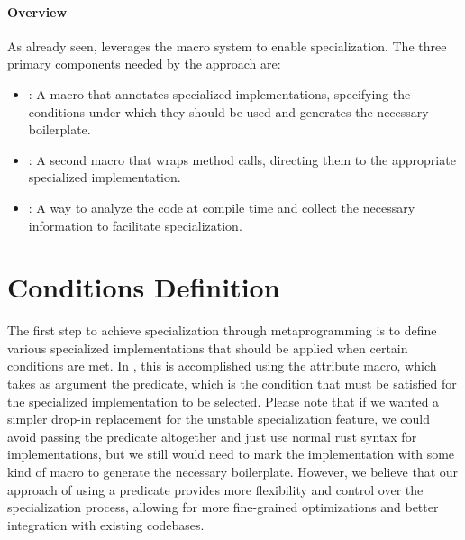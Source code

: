 \paragraph{Overview}
As already seen, \mytool{} leverages the macro system to enable specialization.
The three primary components needed by the approach are:
\begin{itemize}
	\item \textbf{}: A macro that annotates specialized implementations, specifying the conditions under which they should be used and generates the necessary boilerplate.
	\item \textbf{}: A second macro that wraps method calls, directing them to the appropriate specialized implementation.
	\item \textbf{}: A way to analyze the code at compile time and collect the necessary information to facilitate specialization.
\end{itemize}


\section{Conditions Definition}\label{sec:conditions_definition}
The first step to achieve specialization through metaprogramming is to define various specialized implementations that should be applied when certain conditions are met.
In \mytool{}, this is accomplished using the  attribute macro, which takes as argument the predicate, which is the condition that must be satisfied for the specialized implementation to be selected.
Please note that if we wanted a simpler drop-in replacement for the unstable specialization feature, we could avoid passing the predicate altogether and just use normal rust syntax for implementations, but we still would need to mark the implementation with some kind of macro to generate the necessary boilerplate.
However, we believe that our approach of using a predicate provides more flexibility and control over the specialization process, allowing for more fine-grained optimizations and better integration with existing codebases.

